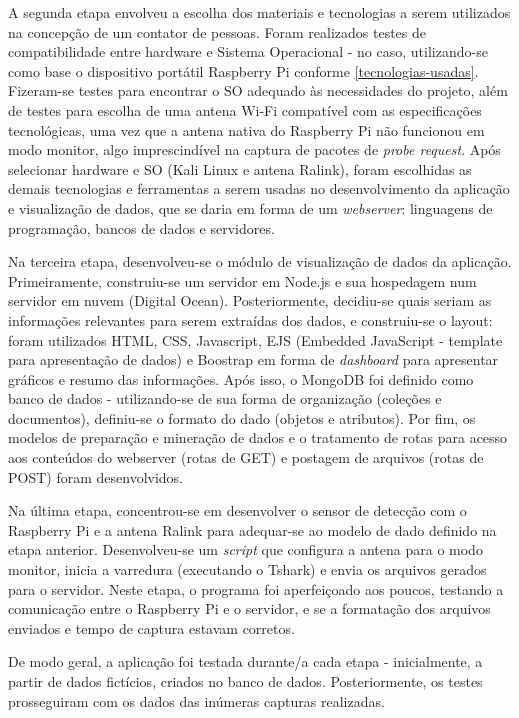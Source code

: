 A segunda etapa envolveu a escolha dos materiais e tecnologias a serem
utilizados na concepção de um contator de pessoas. Foram realizados testes de
compatibilidade entre hardware e Sistema Operacional - no caso, utilizando-se
como base o dispositivo portátil Raspberry Pi conforme
\autoref{tecnologias-usadas}. Fizeram-se testes para encontrar o SO adequado às
necessidades do projeto, além de testes para escolha de uma antena Wi-Fi
compatível com as especificações tecnológicas, uma vez que a antena nativa do
Raspberry Pi não funcionou em modo monitor, algo imprescindível na captura de
pacotes de \emph{probe request}. Após selecionar hardware e SO (Kali Linux e antena Ralink), foram escolhidas as demais
tecnologias e ferramentas a serem usadas no desenvolvimento da aplicação e
visualização de dados, que se daria em forma de um \emph{webserver}: linguagens
de programação, bancos de dados e servidores.

Na terceira etapa, desenvolveu-se o módulo de visualização de dados da aplicação.
Primeiramente, construiu-se um servidor em Node.js e sua hospedagem num servidor em nuvem (Digital Ocean). Posteriormente, decidiu-se quais seriam as informações relevantes para serem extraídas dos dados, e construiu-se o layout: foram utilizados HTML, CSS, Javascript, EJS (Embedded
JavaScript - template para apresentação de dados) e Boostrap em forma de
\emph{dashboard} para apresentar gráficos e resumo das informações. Após isso, o
MongoDB foi definido como banco de dados - utilizando-se de sua forma de
organização (coleções e documentos), definiu-se o formato do dado (objetos e
atributos). Por fim, os modelos de preparação e mineração  de dados e o
tratamento de rotas para acesso aos conteúdos do webserver (rotas de GET) e
postagem de arquivos (rotas de POST) foram desenvolvidos.

Na última etapa, concentrou-se em desenvolver o sensor de detecção com o
Raspberry Pi e a antena Ralink para adequar-se ao modelo de dado definido na
etapa anterior. Desenvolveu-se um \emph{script} que configura a antena para o
modo monitor, inicia a varredura (executando o Tshark) e envia os arquivos
gerados para o servidor. Neste etapa, o programa foi aperfeiçoado aos poucos,
testando a comunicação entre o Raspberry Pi e o servidor, e se a formatação dos
arquivos enviados e tempo de captura estavam corretos.

De modo geral, a aplicação foi testada durante/a cada etapa - inicialmente,
a partir de dados fictícios, criados no banco de dados. Posteriormente, os testes
prosseguiram com os dados das inúmeras capturas realizadas.

